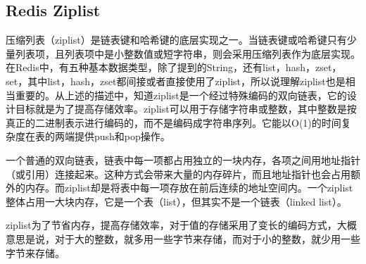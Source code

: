 \documentclass[../../../interview-questions.tex]{subfiles}
\begin{document}
\subsection{Redis Ziplist}

压缩列表（ziplist）是链表键和哈希键的底层实现之一。当链表键或哈希键只有少量列表项，且列表项中是小整数值或短字符串，则会采用压缩列表作为底层实现。在Redis中，有五种基本数据类型，除了提到的String，还有list，hash，zset，set，其中list，hash，zset都间接或者直接使用了ziplist，所以说理解ziplist也是相当重要的。从上述的描述中，知道ziplist是一个经过特殊编码的双向链表，它的设计目标就是为了提高存储效率。ziplist可以用于存储字符串或整数，其中整数是按真正的二进制表示进行编码的，而不是编码成字符串序列。它能以O(1)的时间复杂度在表的两端提供push和pop操作。

一个普通的双向链表，链表中每一项都占用独立的一块内存，各项之间用地址指针（或引用）连接起来。这种方式会带来大量的内存碎片，而且地址指针也会占用额外的内存。而ziplist却是将表中每一项存放在前后连续的地址空间内。一个ziplist整体占用一大块内存，它是一个表（list），但其实不是一个链表（linked list）。

ziplist为了节省内存，提高存储效率，对于值的存储采用了变长的编码方式，大概意思是说，对于大的整数，就多用一些字节来存储，而对于小的整数，就少用一些字节来存储。
\end{document}
